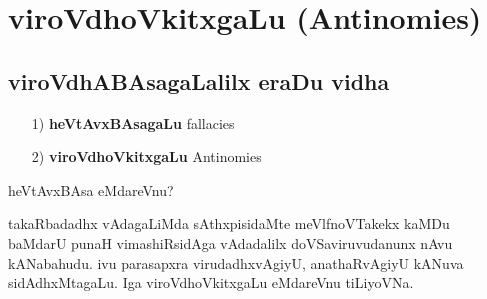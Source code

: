 \chapter{viroVdhoVkitxgaLu (\rm Antinomies)}
\vskip -30pt

\section*{viroVdhABAsagaLalilx eraDu vidha}
\begin{itemize}
\item[{\rm 1)}] {\bf heVtAvxBAsagaLu} {\rm fallacies}
\item[{\rm 2)}] {\bf viroVdhoVkitxgaLu} {\rm Antinomies}
\end{itemize}

heVtAvxBAsa eMdareVnu?

takaRbadadhx vAdagaLiMda sAthxpisidaMte meVlfnoVTakekx kaMDu baMdarU punaH vimashiRsidAga vAdadalilx doVSaviruvudanunx nAvu kANabahudu. ivu parasapxra virudadhxvAgiyU, anathaRvAgiyU kANuva sidAdhxMtagaLu. Iga viroVdhoVkitxgaLu eMdareVnu tiLiyoVNa.

